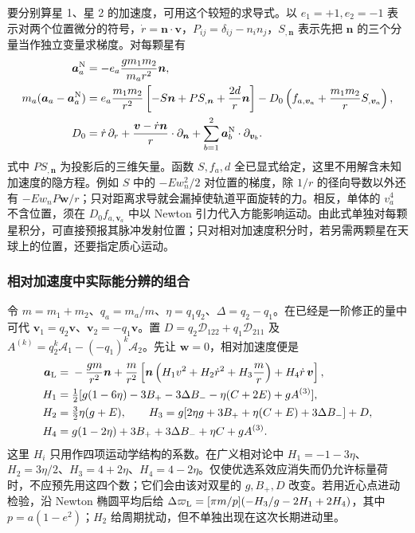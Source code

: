 要分别算星 1、星 2 的加速度，可用这个较短的求导式。以 $e_1=+1,e_2=-1$ 表示对两个位置微分的符号，$\dot r=\bm n\cdot\bm v$，$P_{ij}=\delta_{ij}-n_i n_j$，$S_{,\bm n}$ 表示先把 $\bm n$ 的三个分量当作独立变量求梯度。对每颗星有
\begin{align*}
 \bm a_a^{\rm N}&=-e_a\frac{gm_1m_2}{m_ar^2}\bm n,\\
 m_a(\bm a_a-\bm a_a^{\rm N})
   &= e_a\frac{m_1m_2}{r^2}
       \left[-S\bm n+P S_{,\bm n}+\frac{2d}{r}\bm n\right]
       -D_0\left(f_{a,\bm v_a}+\frac{m_1m_2}{r}S_{,\bm v_a}\right),\\
 D_0&=\dot r\,\partial_r+
      \frac{\bm v-\dot r\bm n}{r}\cdot\partial_{\bm n}
       +\sum_{b=1}^2\bm a_b^{\rm N}\cdot\partial_{\bm v_b}.
\end{align*}
式中 $P S_{,\bm n}$ 为投影后的三维矢量。函数 $S,f_a,d$ 全已显式给定，这里不用解含未知加速度的隐方程。例如 $S$ 中的 $-Ew_n^2/2$ 对位置的梯度，除 $1/r$ 的径向导数以外还有 $-Ew_n P\bm w/r$；只对距离求导就会漏掉使轨道平面旋转的力。相反，单体的 $v_a^4$ 不含位置，须在 $D_0 f_{a,\bm v_a}$ 中以 Newton 引力代入方能影响运动。由此式单独对每颗星积分，可直接预报其脉冲发射位置；只对相对加速度积分时，若另需两颗星在天球上的位置，还要指定质心运动。

\subsubsection{相对加速度中实际能分辨的组合}

令 $m=m_1+m_2$、$q_a=m_a/m$、$\eta=q_1q_2$、$\Delta=q_2-q_1$。在已经是一阶修正的量中可代 $\bm v_1=q_2\bm v$、$\bm v_2=-q_1\bm v$。置 $D=q_2\mathcal D_{122}+q_1\mathcal D_{211}$ 及 $A^{(k)}=q_2^k\mathcal A_1-(-q_1)^k\mathcal A_2$。先让 $\bm w=0$，相对加速度便是
\begin{align*}
 \bm a_{\rm L}={}&-\frac{gm}{r^2}\bm n+
     \frac{m}{r^2}\left[
       \bm n\left(H_1v^2+H_2\dot r^2+H_3\frac m r\right)
                          +H_4\dot r\,\bm v\right],\\
 H_1={}&\tfrac12[g(1-6\eta)-3B_+-3\Delta B_-
                                 -\eta(C+2E)+gA^{(3)}],\\
 H_2={}&\tfrac32\eta(g+E),\qquad
 H_3=g[2\eta g+3B_++\eta(C+E)+3\Delta B_-]+D,\\
 H_4={}&g(1-2\eta)+3B_++3\Delta B_-+\eta C+gA^{(3)} .
\end{align*}
这里 $H_i$ 只用作四项运动学结构的系数。在广义相对论中 $H_1=-1-3\eta$、$H_2=3\eta/2$、$H_3=4+2\eta$、$H_4=4-2\eta$。仅使优选系效应消失而仍允许标量荷时，不应预先用这四个数；它们会由该对双星的 $g,B_+,D$ 改变。若用近心点进动检验，沿 Newton 椭圆平均后给 $\Delta\varpi_{\rm L}=[\pi m/p](-H_3/g-2H_1+2H_4)$，其中 $p=a(1-e^2)$；$H_2$ 给周期扰动，但不单独出现在这次长期进动里。

